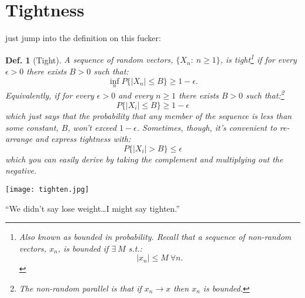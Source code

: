 \documentclass{tufte-book}
\theoremstyle{mytheoremstyle}
\theoremstyle{mylemstyle}
\theoremstyle{mydefstyle}
\newtheorem*{mydef}{Def.}
\begin{document}
\section{Tightness}
 just jump into the definition on this fucker:
\begin{mydef}[Tight] A sequence of random vectors, \(\{X_n:\ n \ge 1\}\), is tight\footnote{Also known as bounded in probability. Recall that a sequence of non-random vectors, \(x_n\), is bounded if \(\exists\ M\) s.t.:
	\[|x_n| \le M\ \forall n\text{.}\]
} if for every \(\epsilon > 0\) there exists \(B > 0\) such that:
	\[\inf_n P\{|X_n| \le B\} \ge 1 - \epsilon \text{.}\]
Equivalently, if for every \(\epsilon > 0\) and every \(n \ge 1\) there exists \(B > 0\) such that:\footnote{The non-random parallel is that if \(x_n \rightarrow x\) then \(x_n\) is bounded.}
	\[P\{|X_i| \le B\} \ge 1- \epsilon \]
which just says that the probability that any member of the sequence is less than some constant, \(B\), won't exceed \(1-\epsilon\). Sometimes, though, it's convenient to re-arrange and express tightness with:
	\[P\{|X_i| > B\} \le \epsilon \]
which you can easily derive by taking the complement and multiplying out the negative.
\end{mydef}
\begin{marginfigure} \texttt{[image: tighten.jpg]} \caption{``We didn't say lose weight\dots I might say tighten.''} \end{marginfigure}
\end{document}
